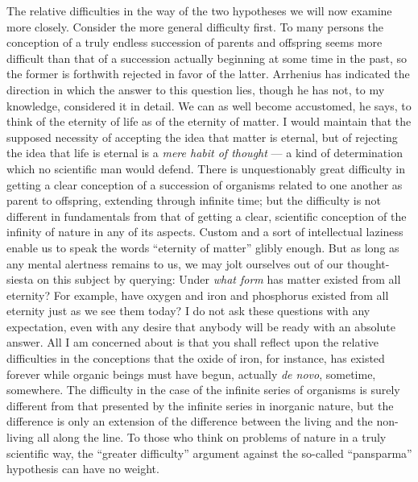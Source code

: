 \documentclass[a4paper, 11pt, oneside, polutonikogreek, english, landscape]{article}
\begin{document}
The relative difficulties in the way of the two hypotheses we will now examine more closely. Consider the more general difficulty first. To many persons the conception of a truly endless succession of parents and offspring seems more difficult than that of a succession actually beginning at some time in the past, so the former is forthwith rejected in favor of the latter. Arrhenius has indicated the direction in which the answer to this question lies, though he has not, to my knowledge, considered it in detail. We can as well become accustomed, he says, to think of the eternity of life as of the eternity of matter. I would maintain that the supposed necessity of accepting the idea that matter is eternal, but of rejecting the idea that life is eternal is a \emph{mere habit of thought} --- a kind of determination which no scientific man would defend. There is unquestionably great difficulty in getting a clear conception of a succession of organisms related to one another as parent to offspring, extending through infinite time; but the difficulty is not different in fundamentals from that of getting a clear, scientific conception of the infinity of nature in any of its aspects. Custom and a sort of intellectual laziness enable us to speak the words ``eternity of matter'' glibly enough. But as long as any mental alertness remains to us, we may jolt ourselves out of our thought-siesta on this subject by querying: Under \emph{what form} has matter existed from all eternity? For example, have oxygen and iron and phosphorus existed from all eternity just as we see them today? I do not ask these questions with any expectation, even with any desire that anybody will be ready with an absolute answer. All I am concerned about is that you shall reflect upon the relative difficulties in the conceptions that the oxide of iron, for instance, has existed forever while organic beings must have begun, actually \emph{de novo}, sometime, somewhere. The difficulty in the case of the infinite series of organisms is surely different from that presented by the infinite series in inorganic nature, but the difference is only an extension of the difference between the living and the non-living all along the line. To those who think on problems of nature in a truly scientific way, the ``greater difficulty'' argument against the so-called ``pansparma'' hypothesis can have no weight.
\end{document}
